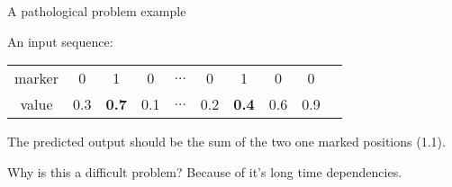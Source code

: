 \begin{frame}{A pathological problem example}


An input sequence:

\vspace{1em}

\begin{tabular}{|c|c|c|c|c|c|c|c|c|c}
	\hline  marker & 0&  1&  0&  $\hdots$& 0 & 1 & 0 & 0  \\ 
	  value & 0.3&  \textbf{0.7}&  0.1&  $\hdots$& 0.2& \textbf{0.4} & 0.6& 0.9  \\ 
	\hline 
\end{tabular}

\vspace{1em}
The predicted output should be the sum of the two one marked positions (1.1). 
\pause
\vspace{1em}
\begin{block}{Why is this a difficult problem?}
	\pause
	Because of it's long time dependencies.
\end{block}

\end{frame}

